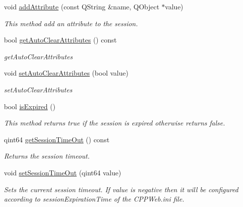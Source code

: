 \begin{DoxyCompactItemize}
\mbox{\label{class_http_session_a9d7250801e2b43f61b28facf2b48c1b5}} 
void \hyperlink{class_http_session_a9d7250801e2b43f61b28facf2b48c1b5}{add\+Attribute} (const Q\+String \&name, Q\+Object $\ast$value)
\begin{DoxyCompactList}\small\item\em This method add an attribute to the session. \end{DoxyCompactList}\item 
\mbox{\label{class_http_session_a0bb33f4c387b07264245de390984be10}} 
bool \hyperlink{class_http_session_a0bb33f4c387b07264245de390984be10}{get\+Auto\+Clear\+Attributes} () const
\begin{DoxyCompactList}\small\item\em get\+Auto\+Clear\+Attributes \end{DoxyCompactList}\item 
\mbox{\label{class_http_session_a6ba761b5e4935168f867b3e4953a4179}} 
void \hyperlink{class_http_session_a6ba761b5e4935168f867b3e4953a4179}{set\+Auto\+Clear\+Attributes} (bool value)
\begin{DoxyCompactList}\small\item\em set\+Auto\+Clear\+Attributes \end{DoxyCompactList}\item 
\mbox{\label{class_http_session_a32e93aea1e8bbadcdf0d755110a95335}} 
bool \hyperlink{class_http_session_a32e93aea1e8bbadcdf0d755110a95335}{is\+Expired} ()
\begin{DoxyCompactList}\small\item\em This method returns true if the session is expired otherwise returns false. \end{DoxyCompactList}\item 
\mbox{\label{class_http_session_a4f586411d351cc4fa7fa9a93a326f63d}} 
qint64 \hyperlink{class_http_session_a4f586411d351cc4fa7fa9a93a326f63d}{get\+Session\+Time\+Out} () const
\begin{DoxyCompactList}\small\item\em Returns the session timeout. \end{DoxyCompactList}\item 
\mbox{\label{class_http_session_acb26c366a8df09ac2c1433730881481a}} 
void \hyperlink{class_http_session_acb26c366a8df09ac2c1433730881481a}{set\+Session\+Time\+Out} (qint64 value)
\begin{DoxyCompactList}\small\item\em Sets the current session timeout. If value is negative then it will be configured according to session\+Expiration\+Time of the C\+P\+P\+Web.\+ini file. \end{DoxyCompactList}\end{DoxyCompactItemize}

